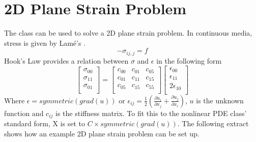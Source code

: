\section{2D Plane Strain Problem}
The \NLPDE class can be used to solve a 2D plane strain problem. In continuous
media, stress is given by Lam\'e's .
\begin{equation} 
-\sigma_{ij,j}=f
\label{symbolic eq2}
\end{equation} 
Hook's Law provides a relation between $\sigma$ and $\epsilon$ in the following form
\begin{equation}
\left[ \begin{array}{c}
\sigma_{00} \\
\sigma_{11} \\
\sigma_{01} \\
\end{array} \right] = 
\left[ \begin{array}{ccc}
c_{00} & c_{01} & c_{05}\\
c_{01} & c_{11} & c_{15}\\
c_{05} & c_{15} & c_{55}\\
\end{array}\right]
\left[ \begin{array}{c}
\epsilon_{00} \\
\epsilon_{11} \\
2\epsilon_{10} \\
\end{array} \right]
\label{symbolic eq3}
\end{equation}
Where $\epsilon = symmetric(grad(u)) \text{ or } %
\epsilon_{ij}=\frac{1}{2}\left(\frac{\partial u_i}{\partial x_j} + %
{\frac{\partial u_j}{\partial x_i}}\right)$, $u$ is the unknown function and
$c_{ij}$ is the stiffness matrix. To fit this to the nonlinear PDE class'
standard form, X is set to $C \times symmetric(grad(u))$.
The following \PYTHON extract shows how an example 2D plane strain problem can
be set up. 

